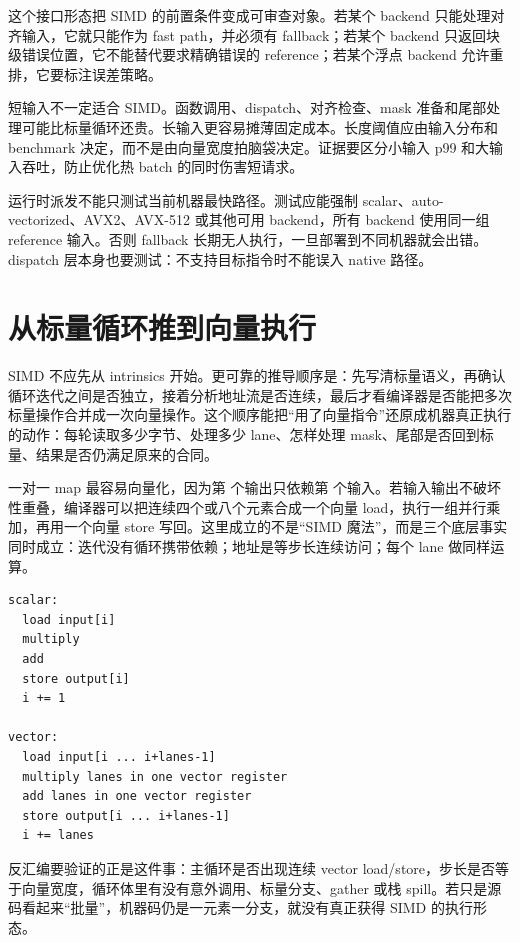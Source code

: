 这个接口形态把 SIMD 的前置条件变成可审查对象。若某个 backend 只能处理对齐输入，它就只能作为 fast path，并必须有 fallback；若某个 backend 只返回块级错误位置，它不能替代要求精确错误的 reference；若某个浮点 backend 允许重排，它要标注误差策略。

短输入不一定适合 SIMD。函数调用、dispatch、对齐检查、mask 准备和尾部处理可能比标量循环还贵。长输入更容易摊薄固定成本。长度阈值应由输入分布和 benchmark 决定，而不是由向量宽度拍脑袋决定。证据要区分小输入 p99 和大输入吞吐，防止优化热 batch 的同时伤害短请求。

运行时派发不能只测试当前机器最快路径。测试应能强制 scalar、auto-vectorized、AVX2、AVX-512 或其他可用 backend，所有 backend 使用同一组 reference 输入。否则 fallback 长期无人执行，一旦部署到不同机器就会出错。dispatch 层本身也要测试：不支持目标指令时不能误入 native 路径。

\section{从标量循环推到向量执行}

SIMD 不应先从 intrinsics 开始。更可靠的推导顺序是：先写清标量语义，再确认循环迭代之间是否独立，接着分析地址流是否连续，最后才看编译器是否能把多次标量操作合并成一次向量操作。这个顺序能把“用了向量指令”还原成机器真正执行的动作：每轮读取多少字节、处理多少 lane、怎样处理 mask、尾部是否回到标量、结果是否仍满足原来的合同。

一对一 map 最容易向量化，因为第  个输出只依赖第  个输入。若输入输出不破坏性重叠，编译器可以把连续四个或八个元素合成一个向量 load，执行一组并行乘加，再用一个向量 store 写回。这里成立的不是“SIMD 魔法”，而是三个底层事实同时成立：迭代没有循环携带依赖；地址是等步长连续访问；每个 lane 做同样运算。

\begin{lstlisting}[numbers=none,caption={标量循环到向量循环的机器形状}]
scalar:
  load input[i]
  multiply
  add
  store output[i]
  i += 1

vector:
  load input[i ... i+lanes-1]
  multiply lanes in one vector register
  add lanes in one vector register
  store output[i ... i+lanes-1]
  i += lanes
\end{lstlisting}

反汇编要验证的正是这件事：主循环是否出现连续 vector load/store，步长是否等于向量宽度，循环体里有没有意外调用、标量分支、gather 或栈 spill。若只是源码看起来“批量”，机器码仍是一元素一分支，就没有真正获得 SIMD 的执行形态。


